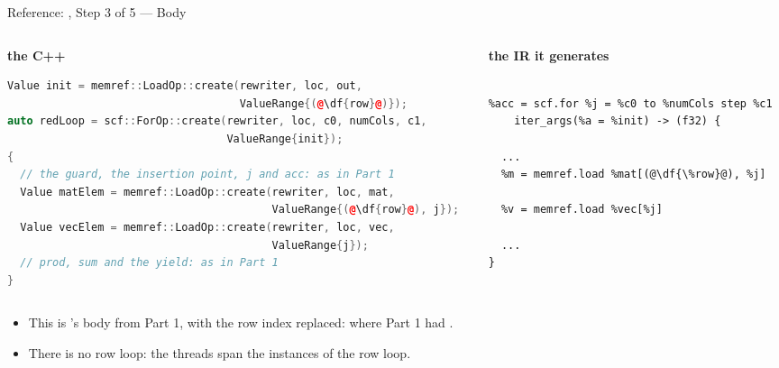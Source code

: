 \documentclass[aspectratio=169,10pt]{beamer}
\begin{document}
\begin{frame}[fragile]{Reference: , Step 3 of 5 --- Body}
  \begin{columns}[t]
    \begin{column}{0.59\textwidth}
      \begin{center}\small\textbf{the C++}\end{center}
\begin{lstlisting}[style=halfs,language=C++,morekeywords={auto,Value}]
Value init = memref::LoadOp::create(rewriter, loc, out,
                                    ValueRange{(@\df{row}@)});
auto redLoop = scf::ForOp::create(rewriter, loc, c0, numCols, c1,
                                  ValueRange{init});
{
  // the guard, the insertion point, j and acc: as in Part 1
  Value matElem = memref::LoadOp::create(rewriter, loc, mat,
                                         ValueRange{(@\df{row}@), j});
  Value vecElem = memref::LoadOp::create(rewriter, loc, vec,
                                         ValueRange{j});
  // prod, sum and the yield: as in Part 1
}
\end{lstlisting}
    \end{column}
    \begin{column}{0.40\textwidth}
      \begin{center}\small\textbf{the IR it generates}\end{center}
\begin{lstlisting}[style=halfs,language=mlir]
%init = memref.load %out[(@\df{\%row}@)]

%acc = scf.for %j = %c0 to %numCols step %c1
    iter_args(%a = %init) -> (f32) {

  ...
  %m = memref.load %mat[(@\df{\%row}@), %j]

  %v = memref.load %vec[%j]

  ...
}
\end{lstlisting}
    \end{column}
  \end{columns}
  \vspace{0.6em}
  \begin{itemize}
    \item<2-> This is 's body from Part 1, with the row
      index replaced:  where Part 1 had .
    \item<3-> There is no row loop: \alert{the threads span the instances of the
      row loop}.
  \end{itemize}
\end{frame}
\end{document}
